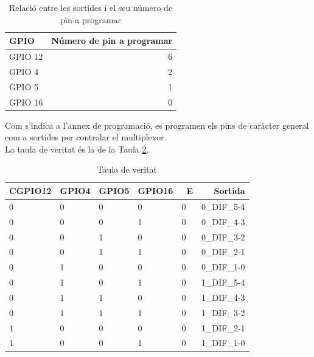 \begin{table}[H]
\small
\begin{center}
 \begin{tabular} {|l|r|}%
 \hline
 GPIO & Número de pin a programar  \\ \hline \hline 
GPIO 12 & 6 \\ \hline
GPIO 4 & 2 \\ \hline
GPIO 5 & 1 \\ \hline
GPIO 16 & 0 \\ \hline
 \end{tabular}
 \caption{Relació entre les sortides i el seu número de pin a programar}
 \label{tab:programacio_pins}
\end{center}
\end{table}

\noindent Com s'indica a l'annex de programació, es programen els pins de caràcter general com a sortides per controlar el multiplexor.\\
\newline La taula de veritat és la de la Taula \ref{tab:veritat}.

\begin{table}[H]
\small
\begin{center}
 \begin{tabular} {|l|l|l|l|l|r|}%
 \hline
 CGPIO12 & GPIO4 & GPIO5 & GPIO16 & ~E & Sortida \\ \hline \hline 
 0 & 0 & 0 & 0 & 0 & 0\_DIF\_5-4 \\ \hline
 0 & 0 & 0 & 1 & 0 & 0\_DIF\_4-3 \\ \hline
 0 & 0 & 1 & 0 & 0 & 0\_DIF\_3-2 \\ \hline
 0 & 0 & 1 & 1 & 0 & 0\_DIF\_2-1 \\ \hline
 0 & 1 & 0 & 0 & 0 & 0\_DIF\_1-0 \\ \hline
 
 0 & 1 & 0 & 1 & 0 & 1\_DIF\_5-4 \\ \hline
 0 & 1 & 1 & 0 & 0 & 1\_DIF\_4-3 \\ \hline
 0 & 1 & 1 & 1 & 0 & 1\_DIF\_3-2 \\ \hline
 1 & 0 & 0 & 0 & 0 & 1\_DIF\_2-1 \\ \hline
 1 & 0 & 0 & 1 & 0 & 1\_DIF\_1-0 \\ \hline
 \end{tabular}
 \caption{Taula de veritat}
 \label{tab:veritat}
\end{center}
\end{table}

